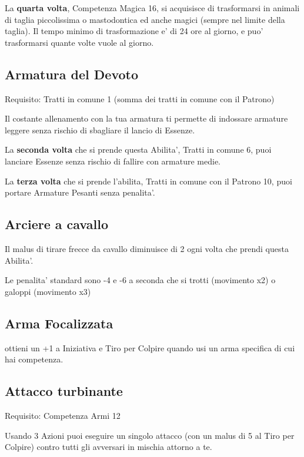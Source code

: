 \documentclass[a4paper,11pt,twoside,openany]{book}
\begin{document}
La \textbf{quarta volta}, Competenza Magica 16, si acquisisce di trasformarsi in animali di taglia piccolissima o mastodontica ed anche magici (sempre nel limite della taglia). Il tempo minimo di trasformazione e' di 24 ore al giorno, e puo' trasformarsi quante volte vuole al giorno.

\subsection{Armatura del Devoto}

Requisito: Tratti in comune 1 (somma dei tratti in comune con il Patrono)

Il costante allenamento con la tua armatura ti permette di indossare armature leggere senza rischio di sbagliare il lancio di Essenze.

La \textbf{seconda volta} che si prende questa Abilita', Tratti in comune 6, puoi lanciare Essenze senza rischio di fallire con armature medie.

La \textbf{terza volta} che si prende l'abilita, Tratti in comune con il Patrono 10, puoi portare Armature Pesanti senza penalita'.

\subsection{Arciere a cavallo}

Il malus di tirare frecce da cavallo diminuisce di 2 ogni volta che prendi questa Abilita'.

Le penalita' standard sono -4 e -6 a seconda che si trotti (movimento x2) o galoppi (movimento x3)

\subsection{Arma Focalizzata}

ottieni un +1 a Iniziativa e Tiro per Colpire quando usi un arma specifica
di cui hai competenza.

\subsection{Attacco turbinante}

Requisito: Competenza Armi 12

Usando 3 Azioni puoi eseguire un singolo attacco (con un malus di
5 al Tiro per Colpire) contro tutti gli avversari in mischia attorno
a te.
\end{document}
